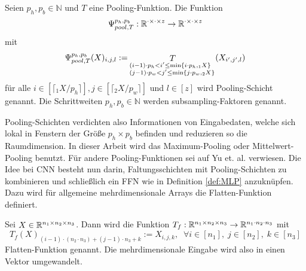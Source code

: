 \begin{defi}
    Seien $p_h, p_b \in \mathbb{N}$ und $T$ eine Pooling-Funktion. Die Funktion 
    \begin{equation*}
        \Psi_{pool,T}^{p_h,p_b}: \mathbb{R}^{\cdot \times \cdot \times z} \rightarrow \mathbb{R}^{\cdot \times \cdot\times z}
    \end{equation*}
    mit
    \begin{equation*}
        \Psi_{pool,T}^{p_h,p_b}(X)_{i,j,l}:= \mathop{T}_{\begin{subarray}{l}(i-1) \cdot p_h < i' \leq \min\{i \cdot p_h, {}_1 X\} \\ 
        (j-1) \cdot p_w < j' \leq \min\{j \cdot p_w, {}_2 X\}\end{subarray}} (X_{i',j',l})  
    \end{equation*}
    für alle  $i \in [\lceil {}_1 X/p_h \rceil], j \in [\lceil {}_2 X/p_w \rceil]$ und $l \in [z]$ wird Pooling-Schicht genannt. Die Schrittweiten $p_h, p_b \in \mathbb{N}$ werden subsampling-Faktoren genannt.
\end{defi}

Pooling-Schichten verdichten also Informationen von Eingabedaten, welche sich lokal in Fenstern der Größe $p_h \times p_b$ befinden und reduzieren so die Raumdimension. In dieser Arbeit wird das Maximum-Pooling oder Mittelwert-Pooling benutzt. Für andere Pooling-Funktionen sei auf Yu et. al.\cite{yu2014mixed} verwiesen.
Die Idee bei CNN besteht nun darin, Faltungsschichten mit Pooling-Schichten zu kombinieren und schließlich ein FFN wie in Definition \ref{def:MLP} anzuknüpfen.
Dazu wird für allgemeine mehrdimensionale Arrays die Flatten-Funktion definiert.

\begin{defi}
    \label{def:flatten}
    Sei $X \in \mathbb{R}^{n_1 \times n_2 \times n_3}$. Dann wird die Funktion $T_f:\mathbb{R}^{n_1 \times n_2 \times n_3} \rightarrow \mathbb{R}^{n_1 \cdot n_2 \cdot n_3}$ mit 
    \begin{equation*}
        T_f(X)_{(i-1) \cdot (n_2 \cdot n_3)+(j-1) \cdot n_3+k}:= X_{i,j,k}, \; \; \forall i \in [n_1],\; j \in [n_2],\; k \in [n_3]
    \end{equation*}
    Flatten-Funktion genannt. Die mehrdimensionale Eingabe wird also in einen Vektor umgewandelt.
\end{defi}

